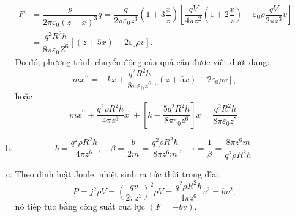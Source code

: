 \begin{loigiai}
\begin{enumerate}[1)]
\begin{enumerate}[a)]
\begin{align*}
F &= \dfrac{p}{2 \pi \varepsilon_{0}(z-x)^{3}} q=\dfrac{q}{2 \pi \varepsilon_{0} z^{3}}\left(1+3 \dfrac{x}{z}\right)\left[\dfrac{q V}{4 \pi z^{2}}\left(1+2 \dfrac{x}{z}\right)-\varepsilon_{0} \rho \dfrac{q V}{2 \pi z^{3}} v\right]\\
 &= \dfrac{q^{2} R^{2} h}{8 \pi \varepsilon_{0} Z^{6}}\left[(z+5 x)-2 \varepsilon_{0} \rho v\right].
\end{align*}
Do đó, phương trình chuyển động của quả cầu được viết dưới dạng:
\[
m x^{\prime \prime}=-k x+\dfrac{q^{2} R^{2} h}{8 \pi \varepsilon_{0} z^{6}}\left[(z+5 x)-2 \varepsilon_{0} \rho v\right],
\]
hoặc
\[
m x^{\prime \prime}+\dfrac{q^{2} \rho R^{2} h}{4 \pi z^{6}} x^{\prime}+\left[k-\dfrac{5 q^{2} R^{2} h}{8 \pi \varepsilon_{0} z^{6}}\right] x=\dfrac{q^{2} R^{2} h}{8 \pi \varepsilon_{0} z^{5}}.
\]
\item \[
b=\dfrac{q^{2} \rho R^{2} h}{4 \pi z^{6}}, \quad \beta=\dfrac{b}{2 m}=\dfrac{q^{2} \rho R^{2} h}{8 \pi z^{6} m}, \quad \tau=\dfrac{1}{\beta}=\dfrac{8 \pi z^{6} m}{q^{2} \rho R^{2} h}.
\]
\item Theo định luật Joule, nhiệt sinh ra tức thời trong đĩa:
\[
P=j^{2} \rho V=\left(\dfrac{q v}{2 \pi z^{3}}\right)^{2} \rho V=\dfrac{q^{2} \rho R^{2} h}{4 \pi z^{6}} v^{2}=b v^{2},
\]
nó tiếp tục bằng công suất của lực $(F=-bv)$.
\end{enumerate}
\end{enumerate}
\end{loigiai}


